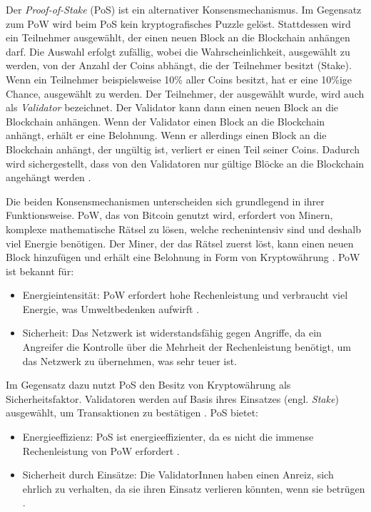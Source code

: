 Der \textit{Proof-of-Stake} (PoS) ist ein alternativer Konsensmechanismus. Im Gegensatz zum PoW wird beim PoS kein kryptografisches Puzzle gelöst. Stattdessen wird ein Teilnehmer ausgewählt, der einen neuen Block an die Blockchain anhängen darf. Die Auswahl erfolgt zufällig, wobei die Wahrscheinlichkeit, ausgewählt zu werden, von der Anzahl der Coins abhängt, die der Teilnehmer besitzt (Stake). Wenn ein Teilnehmer beispielsweise 10\% aller Coins besitzt, hat er eine 10\%ige Chance, ausgewählt zu werden. Der Teilnehmer, der ausgewählt wurde, wird auch als \textit{Validator} bezeichnet. Der Validator kann dann einen neuen Block an die Blockchain anhängen. Wenn der Validator einen Block an die Blockchain anhängt, erhält er eine Belohnung. Wenn er allerdings einen Block an die Blockchain anhängt, der ungültig ist, verliert er einen Teil seiner Coins. Dadurch wird sichergestellt, dass von den Validatoren nur gültige Blöcke an die Blockchain angehängt werden \parencites[S. 96-97]{Kapengut_EthereumTransitionToProofOfStake}[S. 34]{Meinel_BlockchainHypeInnovation}[S. 320-321]{Antonopoulos_MasteringEthereum}.

Die beiden Konsensmechanismen unterscheiden sich grundlegend in ihrer Funktionsweise. PoW, das von Bitcoin genutzt wird, erfordert von Minern, komplexe mathematische Rätsel zu lösen, welche rechenintensiv sind und deshalb viel Energie benötigen. Der Miner, der das Rätsel zuerst löst, kann einen neuen Block hinzufügen und erhält eine Belohnung in Form von Kryptowährung \parencite{Fill_BlockchainGrundlagen}. PoW ist bekannt für:

\begin{itemize}
    \item Energieintensität: PoW erfordert hohe Rechenleistung und verbraucht viel Energie, was Umweltbedenken aufwirft \parencite[S. 96-97]{Kapengut_EthereumTransitionToProofOfStake}.
    \item Sicherheit: Das Netzwerk ist widerstandsfähig gegen Angriffe, da ein Angreifer die Kontrolle über die Mehrheit der Rechenleistung benötigt, um das Netzwerk zu übernehmen, was sehr teuer ist.
\end{itemize}

\noindent Im Gegensatz dazu nutzt PoS den Besitz von Kryptowährung als Sicherheitsfaktor. Validatoren werden auf Basis ihres Einsatzes (engl. \textit{Stake}) ausgewählt, um Transaktionen zu bestätigen \parencites[S. 34]{Meinel_BlockchainHypeInnovation}[S. 320-321]{Antonopoulos_MasteringEthereum}. PoS bietet:

\begin{itemize}
    \item Energieeffizienz: PoS ist energieeffizienter, da es nicht die immense Rechenleistung von PoW erfordert \parencite[S. 96-97]{Kapengut_EthereumTransitionToProofOfStake}.
    \item Sicherheit durch Einsätze: Die ValidatorInnen haben einen Anreiz, sich ehrlich zu verhalten, da sie ihren Einsatz verlieren könnten, wenn sie betrügen \parencites[S. 34]{Meinel_BlockchainHypeInnovation}[S. 320-321]{Antonopoulos_MasteringEthereum}.
\end{itemize}

